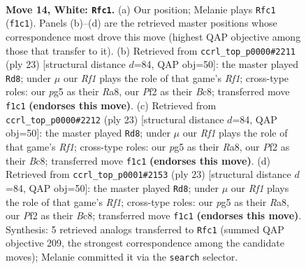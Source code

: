 \documentclass[11pt]{article}
\begin{document}
\clearpage

\begin{figure}[p]\centering
\begin{subfigure}{0.46\textwidth}\centering
\resizebox{\linewidth}{!}{%
\newchessgame
\chessboard[
  setfen={rnbr2k1/5p2/1p2pn1p/p1b1N1p1/2B5/2N1P1B1/PP3PPP/R4RK1 w - - 0 14},
  showmover=false,
  pgfstyle=straightmove, color=movearrow, markmove={f1-c1}
]}
\caption{}
\end{subfigure}\hfill
\begin{subfigure}{0.46\textwidth}\centering
\resizebox{\linewidth}{!}{%
\newchessgame
\chessboard[
  setfen={r1b2rk1/1p1n1ppp/p3p3/P1bn4/2N5/2PB1N2/1P3PPP/R1B1K2R b KQ - 2 12},
  showmover=false,
  pgfstyle=straightmove, color=movearrow, markmove={f8-d8}
]}
\caption{}
\end{subfigure}
\\[4pt]
\begin{subfigure}{0.46\textwidth}\centering
\resizebox{\linewidth}{!}{%
\newchessgame
\chessboard[
  setfen={r1b2rk1/1p1n1ppp/p3p3/P1bn4/2N5/2PB1N2/1P3PPP/R1B1K2R b KQ - 2 12},
  showmover=false,
  pgfstyle=straightmove, color=movearrow, markmove={f8-d8}
]}
\caption{}
\end{subfigure}\hfill
\begin{subfigure}{0.46\textwidth}\centering
\resizebox{\linewidth}{!}{%
\newchessgame
\chessboard[
  setfen={r1b2rk1/1p1n1ppp/p3p3/P1bn4/2N5/2PB1N2/1P3PPP/R1B1K2R b KQ - 2 12},
  showmover=false,
  pgfstyle=straightmove, color=movearrow, markmove={f8-d8}
]}
\caption{}
\end{subfigure}
\caption{\textbf{Move 14, White: \texttt{Rfc1}.} (a) Our position; Melanie plays \texttt{Rfc1} (\texttt{f1c1}). Panels (b)--(d) are the retrieved master positions whose correspondence most drove this move (highest QAP objective among those that transfer to it). (b) Retrieved from \texttt{ccrl\_top\_p0000\#2211} (ply 23) [structural distance $d$=84, QAP obj=50]: the master played \texttt{Rd8}; under $\mu$ our \emph{Rf1} plays the role of that game's \emph{Rf1}; cross-type roles: our \emph{p}g5 as their \emph{R}a8, our \emph{P}f2 as their \emph{B}c8; transferred move \texttt{f1c1} \textbf{(endorses this move)}. (c) Retrieved from \texttt{ccrl\_top\_p0000\#2212} (ply 23) [structural distance $d$=84, QAP obj=50]: the master played \texttt{Rd8}; under $\mu$ our \emph{Rf1} plays the role of that game's \emph{Rf1}; cross-type roles: our \emph{p}g5 as their \emph{R}a8, our \emph{P}f2 as their \emph{B}c8; transferred move \texttt{f1c1} \textbf{(endorses this move)}. (d) Retrieved from \texttt{ccrl\_top\_p0001\#2153} (ply 23) [structural distance $d$=84, QAP obj=50]: the master played \texttt{Rd8}; under $\mu$ our \emph{Rf1} plays the role of that game's \emph{Rf1}; cross-type roles: our \emph{p}g5 as their \emph{R}a8, our \emph{P}f2 as their \emph{B}c8; transferred move \texttt{f1c1} \textbf{(endorses this move)}. Synthesis: 5 retrieved analogs transferred to \texttt{Rfc1} (summed QAP objective 209, the strongest correspondence among the candidate moves); Melanie committed it via the \texttt{search} selector.}
\label{fig:thought-m26}
\end{figure}
\end{document}
